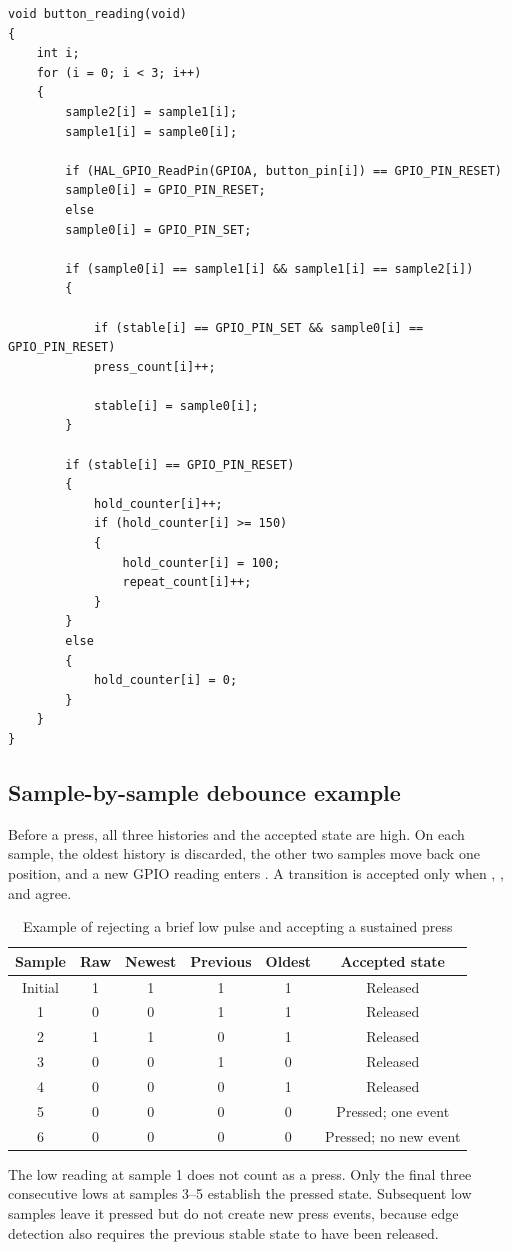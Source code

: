 \documentclass[a4paper]{article}
\newcommand{\code}[1]{\texttt{\detokenize{#1}}}
\newcommand{\topic}[1]{\subsection{#1}}
\begin{document}
\begin{lstlisting}[caption={Button sampling, edge detection, and hold counting}]
void button_reading(void)
{
    int i;
    for (i = 0; i < 3; i++)
    {
        sample2[i] = sample1[i];
        sample1[i] = sample0[i];

        if (HAL_GPIO_ReadPin(GPIOA, button_pin[i]) == GPIO_PIN_RESET)
        sample0[i] = GPIO_PIN_RESET;
        else
        sample0[i] = GPIO_PIN_SET;

        if (sample0[i] == sample1[i] && sample1[i] == sample2[i])
        {

            if (stable[i] == GPIO_PIN_SET && sample0[i] == GPIO_PIN_RESET)
            press_count[i]++;

            stable[i] = sample0[i];
        }

        if (stable[i] == GPIO_PIN_RESET)
        {
            hold_counter[i]++;
            if (hold_counter[i] >= 150)
            {
                hold_counter[i] = 100;
                repeat_count[i]++;
            }
        }
        else
        {
            hold_counter[i] = 0;
        }
    }
}
\end{lstlisting}

\topic{Sample-by-sample debounce example}

Before a press, all three histories and the accepted state are high. On each
sample, the oldest history is discarded, the other two samples move back one
position, and a new GPIO reading enters \code{sample0}. A transition is
accepted only when \code{sample0}, \code{sample1}, and \code{sample2} agree.
\begin{table}[htbp]\centering
\caption{Example of rejecting a brief low pulse and accepting a sustained press}
\begin{tabular}{cccccc}\toprule
Sample & Raw & Newest & Previous & Oldest & Accepted state\\\midrule
Initial & 1 & 1 & 1 & 1 & Released\\
1 & 0 & 0 & 1 & 1 & Released\\
2 & 1 & 1 & 0 & 1 & Released\\
3 & 0 & 0 & 1 & 0 & Released\\
4 & 0 & 0 & 0 & 1 & Released\\
5 & 0 & 0 & 0 & 0 & Pressed; one event\\
6 & 0 & 0 & 0 & 0 & Pressed; no new event\\\bottomrule
\end{tabular}\end{table}
The low reading at sample 1 does not count as a press. Only the final three
consecutive lows at samples 3--5 establish the pressed state. Subsequent low
samples leave it pressed but do not create new press events, because edge
detection also requires the previous stable state to have been released.
\end{document}
